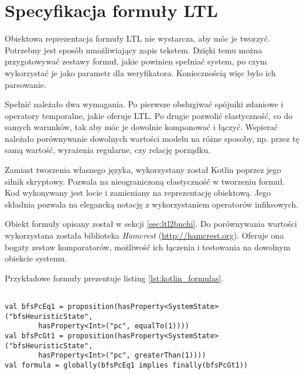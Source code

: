 

\section{Specyfikacja formuły LTL} \label{sec:LTL_formula_spec}

Obiektowa reprezentacja formuły LTL nie wystarcza, aby móc je tworzyć.
Potrzebny jest sposób umożliwiający zapis tekstem.
Dzięki temu można przygotowywać zestawy formuł, jakie powinien spełniać system, po czym wykorzystać je jako parametr dla weryfikatora.
Koniecznością więc było ich parsowanie.

Spełnić należało dwa wymagania.
Po pierwsze obsługiwać spójniki zdaniowe i operatory temporalne, jakie oferuje LTL.
Po drugie pozwolić elastyczność, co do samych warunków, tak aby móc je dowolnie komponować i łączyć.
Wspierać należało porównywanie dowolnych wartości modelu na różne sposoby, np. przez tę samą wartość, wyrażenia regularne, czy relację porządku.

Zamiast tworzenia własnego języka, wykorzystany został Kotlin poprzez jego silnik skryptowy.
Pozwala na nieograniczoną elastyczność w tworzeniu formuł.
Kod wykonywany jest locie i zamieniany na reprezentację obiektową.
Jego składnia pozwala na elegancką notację z wykorzystaniem operatorów infiksowych.

Obiekt formuły opisany został w sekcji \ref{sec:ltl2buchi}.
Do porównywania wartości wykorzystana została biblioteka \textit{Hamcrest} (\url{http://hamcrest.org}).
Oferuje ona bogaty zestaw komparatorów, możliwość ich łączenia i testowania na dowolnym obiekcie systemu.

Przykładowe formuły prezentuje listing \ref{lst:kotlin_formulas}.

\begin{minipage}{\linewidth}
\begin{lstlisting}[caption={Przykładowe formuły LTL w języku Kotlin.},captionpos=b,label={lst:kotlin_formulas}]

val bfsPcEq1 = proposition(hasProperty<SystemState>("bfsHeuristicState", 
        hasProperty<Int>("pc", equalTo(1))))
val bfsPcGt1 = proposition(hasProperty<SystemState>("bfsHeuristicState",
        hasProperty<Int>("pc", greaterThan(1))))
val formula = globally(bfsPcEq1 implies finally(bfsPcGt1))


\end{lstlisting}
\end{minipage}

